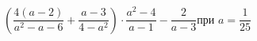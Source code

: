 \begin{ex}[type=expr_calc]
	\begin{condition}
		\( \left( \dfrac{4(a-2)}{a^2-a-6}+\dfrac{a-3}{4-a^2} \right)\cdot\dfrac{a^2-4}{a-1}-\dfrac{2}{a-3} \)\hspace{0.5cm}при \( a=\dfrac{1}{25} \)
	\end{condition}
\end{ex}
